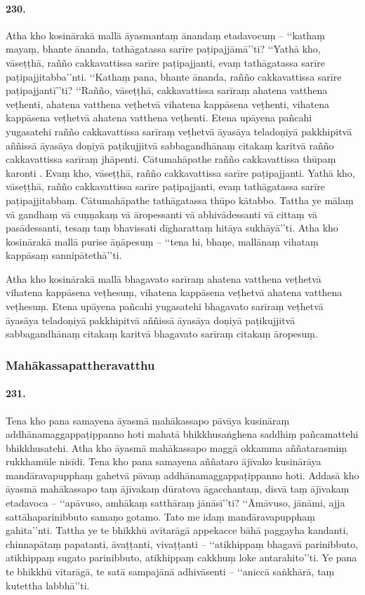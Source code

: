 \paragraph{230.} Atha kho kosinārakā mallā āyasmantaṃ ānandaṃ etadavocuṃ – ‘‘kathaṃ mayaṃ, bhante ānanda, tathāgatassa sarīre paṭipajjāmā’’ti? ‘‘Yathā kho, vāseṭṭhā, rañño cakkavattissa sarīre paṭipajjanti, evaṃ tathāgatassa sarīre paṭipajjitabba’’nti. ‘‘Kathaṃ pana, bhante ānanda, rañño cakkavattissa sarīre paṭipajjantī’’ti? ‘‘Rañño, vāseṭṭhā, cakkavattissa sarīraṃ ahatena vatthena veṭhenti, ahatena vatthena veṭhetvā vihatena kappāsena veṭhenti, vihatena kappāsena veṭhetvā ahatena vatthena veṭhenti. Etena upāyena pañcahi yugasatehi rañño cakkavattissa sarīraṃ veṭhetvā āyasāya teladoṇiyā pakkhipitvā aññissā āyasāya doṇiyā paṭikujjitvā sabbagandhānaṃ citakaṃ karitvā rañño cakkavattissa sarīraṃ jhāpenti. Cātumahāpathe rañño cakkavattissa thūpaṃ karonti . Evaṃ kho, vāseṭṭhā, rañño cakkavattissa sarīre paṭipajjanti. Yathā kho, vāseṭṭhā, rañño cakkavattissa sarīre paṭipajjanti, evaṃ tathāgatassa sarīre paṭipajjitabbaṃ. Cātumahāpathe tathāgatassa thūpo kātabbo. Tattha ye mālaṃ vā gandhaṃ vā cuṇṇakaṃ vā āropessanti vā abhivādessanti vā cittaṃ vā pasādessanti, tesaṃ taṃ bhavissati dīgharattaṃ hitāya sukhāyā’’ti. Atha kho kosinārakā mallā purise āṇāpesuṃ – ‘‘tena hi, bhaṇe, mallānaṃ vihataṃ kappāsaṃ sannipātethā’’ti.

Atha kho kosinārakā mallā bhagavato sarīraṃ ahatena vatthena veṭhetvā vihatena kappāsena veṭhesuṃ, vihatena kappāsena veṭhetvā ahatena vatthena veṭhesuṃ. Etena upāyena pañcahi yugasatehi bhagavato sarīraṃ veṭhetvā āyasāya teladoṇiyā pakkhipitvā aññissā āyasāya doṇiyā paṭikujjitvā sabbagandhānaṃ citakaṃ karitvā bhagavato sarīraṃ citakaṃ āropesuṃ.

\subsubsection{Mahākassapattheravatthu}

\paragraph{231.} Tena kho pana samayena āyasmā mahākassapo pāvāya kusināraṃ addhānamaggappaṭippanno hoti mahatā bhikkhusaṅghena saddhiṃ pañcamattehi bhikkhusatehi. Atha kho āyasmā mahākassapo maggā okkamma aññatarasmiṃ rukkhamūle nisīdi. Tena kho pana samayena aññataro ājīvako kusinārāya mandāravapupphaṃ gahetvā pāvaṃ addhānamaggappaṭippanno hoti. Addasā kho āyasmā mahākassapo taṃ ājīvakaṃ dūratova āgacchantaṃ, disvā taṃ ājīvakaṃ etadavoca – ‘‘apāvuso, amhākaṃ satthāraṃ jānāsī’’ti? ‘‘Āmāvuso, jānāmi, ajja sattāhaparinibbuto samaṇo gotamo. Tato me idaṃ mandāravapupphaṃ gahita’’nti. Tattha ye te bhikkhū avītarāgā appekacce bāhā paggayha kandanti, chinnapātaṃ papatanti, āvaṭṭanti, vivaṭṭanti – ‘‘atikhippaṃ bhagavā parinibbuto, atikhippaṃ sugato parinibbuto, atikhippaṃ cakkhuṃ loke antarahito’’ti. Ye pana te bhikkhū vītarāgā, te satā sampajānā adhivāsenti – ‘‘aniccā saṅkhārā, taṃ kutettha labbhā’’ti.

